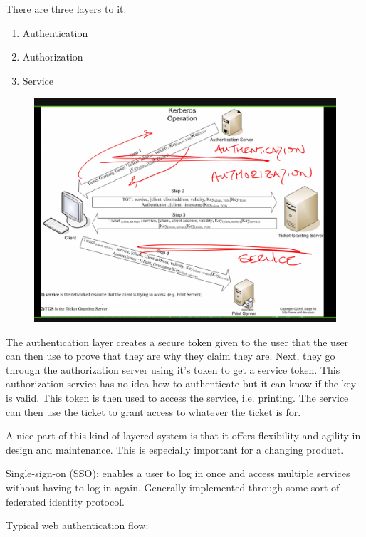 \documentclass[../notes.tex]{subfiles}
\begin{document}
There are three layers to it:
\begin{enumerate}
    \item Authentication
    \item Authorization
    \item Service
\end{enumerate}
\begin{figure}[H]
    \centering
    \includegraphics[width=0.8\linewidth]{img/image_2023-03-13-20-50-25.png}
\end{figure}

The authentication layer creates a secure token given to the user that the user can then use to prove that they are why they claim they are.
Next, they go through the authorization server using it's token to get a service token. This authorization service has no idea how to authenticate but it can know if the key is valid. This token is then used to access the service, i.e. printing.
The service can then use the ticket to grant access to whatever the ticket is for.


\begin{blockquote}
    A nice part of this kind of layered system is that it offers flexibility and agility in design and maintenance. This is especially important for a changing product.
\end{blockquote}




\begin{definition}
    Single-sign-on (SSO): enables a user to log in once and access multiple services without having to log in again. Generally implemented through some sort of federated identity protocol.
\end{definition}


Typical web authentication flow:
\end{document}
